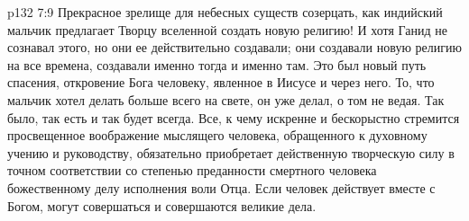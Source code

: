 \vs p132 7:9 \pc Прекрасное зрелище для небесных существ созерцать, как индийский мальчик предлагает Творцу вселенной создать новую религию! И хотя Ганид не сознавал этого, но они ее действительно создавали; они создавали новую религию на все времена, создавали именно тогда и именно там. Это был новый путь спасения, откровение Бога человеку, явленное в Иисусе и через него. То, что мальчик хотел делать больше всего на свете, он уже делал, о том не ведая. Так было, так есть и так будет всегда. Все, к чему искренне и бескорыстно стремится просвещенное воображение мыслящего человека, обращенного к духовному учению и руководству, обязательно приобретает действенную творческую силу в точном соответствии со степенью преданности смертного человека божественному делу исполнения воли Отца. Если человек действует вместе с Богом, могут совершаться и совершаются великие дела.
